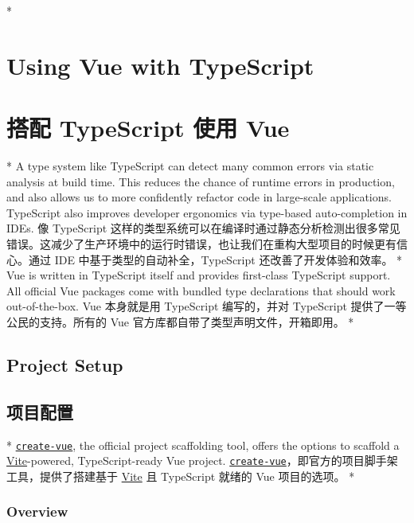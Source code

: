 
\begin{paracol}{2}  
\switchcolumn[0]*%
\section{Using Vue with TypeScript}
\switchcolumn
\section{搭配 TypeScript 使用 Vue}
\switchcolumn[0]*%
A type system like TypeScript can detect many common errors via static
analysis at build time. This reduces the chance of runtime errors in
production, and also allows us to more confidently refactor code in
large-scale applications. TypeScript also improves developer ergonomics
via type-based auto-completion in IDEs.
\switchcolumn
像 TypeScript
这样的类型系统可以在编译时通过静态分析检测出很多常见错误。这减少了生产环境中的运行时错误，也让我们在重构大型项目的时候更有信心。通过
IDE 中基于类型的自动补全，TypeScript 还改善了开发体验和效率。
\switchcolumn[0]*%
Vue is written in TypeScript itself and provides first-class TypeScript
support. All official Vue packages come with bundled type declarations
that should work out-of-the-box.
\switchcolumn
Vue 本身就是用 TypeScript 编写的，并对 TypeScript
提供了一等公民的支持。所有的 Vue 官方库都自带了类型声明文件，开箱即用。
\switchcolumn[0]*%
\subsection{Project Setup}
\switchcolumn
\subsection{项目配置}
\switchcolumn[0]*%
\href{https://github.com/vuejs/create-vue}{\texttt{create-vue}}, the
official project scaffolding tool, offers the options to scaffold a
\href{https://vitejs.dev/}{Vite}-powered, TypeScript-ready Vue project.
\switchcolumn
\href{https://github.com/vuejs/create-vue}{\texttt{create-vue}}，即官方的项目脚手架工具，提供了搭建基于
\href{https://cn.vitejs.dev/}{Vite} 且 TypeScript 就绪的 Vue
项目的选项。
\switchcolumn[0]*%
\subsubsection{Overview}
\switchcolumn

\end{paracol}
